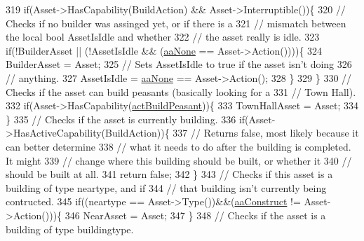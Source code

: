 \begin{DoxyCode}
319             \textcolor{keywordflow}{if}(Asset->HasCapability(BuildAction) && Asset->Interruptible())\{
320                 \textcolor{comment}{// Checks if no builder was assinged yet, or if there is a }
321                 \textcolor{comment}{// mismatch between the local bool AssetIsIdle and whether}
322                 \textcolor{comment}{// the asset really is idle.}
323                 \textcolor{keywordflow}{if}(!BuilderAsset || (!AssetIsIdle && (\hyperlink{GameDataTypes_8h_ab47668e651a3032cfb9c40ea2d60d670ac17cc5a0035320c060d7f8074143b507}{aaNone} == Asset->Action())))\{
324                     BuilderAsset = Asset;
325                     \textcolor{comment}{// Sets AssetIsIdle to true if the asset isn't doing }
326                     \textcolor{comment}{// anything.}
327                     AssetIsIdle = \hyperlink{GameDataTypes_8h_ab47668e651a3032cfb9c40ea2d60d670ac17cc5a0035320c060d7f8074143b507}{aaNone} == Asset->Action();
328                 \}
329             \}
330             \textcolor{comment}{// Checks if the asset can build peasants (basically looking for a }
331             \textcolor{comment}{// Town Hall).}
332             \textcolor{keywordflow}{if}(Asset->HasCapability(\hyperlink{GameDataTypes_8h_a35b98ce26aca678b03c6f9f76e4778cea66c601dce0fc095460b3c2c25f66ee71}{actBuildPeasant}))\{
333                 TownHallAsset = Asset;
334             \}
335             \textcolor{comment}{// Checks if the asset is currently building.}
336             \textcolor{keywordflow}{if}(Asset->HasActiveCapability(BuildAction))\{
337                 \textcolor{comment}{// Returns false, most likely because it can better determine }
338                 \textcolor{comment}{// what it needs to do after the building is completed. It might}
339                 \textcolor{comment}{// change where this building should be built, or whether it }
340                 \textcolor{comment}{// should be built at all.}
341                 \textcolor{keywordflow}{return} \textcolor{keyword}{false};    
342             \}
343             \textcolor{comment}{// Checks if this asset is a building of type neartype, and if }
344             \textcolor{comment}{// that building isn't currently being contructed.}
345             \textcolor{keywordflow}{if}((neartype == Asset->Type())&&(\hyperlink{GameDataTypes_8h_ab47668e651a3032cfb9c40ea2d60d670a7ef6b863f66dd7dcc95a199cd758ae1d}{aaConstruct} != Asset->Action()))\{
346                 NearAsset = Asset;
347             \}
348             \textcolor{comment}{// Checks if the asset is a building of type buildingtype.}

\end{DoxyCode}
